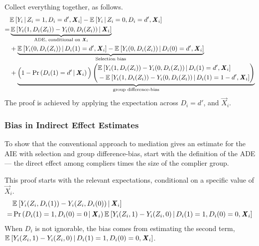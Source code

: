 Collect everything together, as follows.
\begin{align*}
    &  \mathbb{E}_{} \left[ Y_i \, \middle\vert \, Z_i = 1, D_i = d', \boldsymbol{\mathit{X}}_i \right]
    - \mathbb{E}_{} \left[ Y_i \, \middle\vert \, Z_i = 0, D_i = d', \boldsymbol{\mathit{X}}_i \right] \\
    =& \underbrace{
        \mathbb{E}_{} \left[ Y_i(1, D_i(Z_i)) - Y_i(0, D_i(Z_i)) \, \middle\vert \, \boldsymbol{\mathit{X}}_i \right]}_{
            \text{ADE, conditional on }\boldsymbol{\mathit{X}}_i} \\
    &+ \underbrace{
        \mathbb{E}_{} \left[ Y_i(0, D_i(Z_i)) \, \middle\vert \, D_i(1) = d', \boldsymbol{\mathit{X}}_i \right]
            - \mathbb{E}_{} \left[ Y_i(0, D_i(Z_i)) \, \middle\vert \, D_i(0) = d', \boldsymbol{\mathit{X}}_i \right]}_{
                \text{Selection bias}} \\
    &+ \underbrace{\Big(1 - \Pr\left( D_i(1) = d' \, \middle\vert \, \boldsymbol{\mathit{X}}_i \right)\Big)
    \left( \begin{aligned}
        &\mathbb{E}_{} \left[ Y_i(1, D_i(Z_i)) - Y_i(0, D_i(Z_i)) \, \middle\vert \, D_i(1) = d', \boldsymbol{\mathit{X}}_i \right] \\ 
        & - \mathbb{E}_{} \left[ Y_i(1, D_i(Z_i)) - Y_i(0, D_i(Z_i)) \, \middle\vert \, D_i(1) = 1 - d', \boldsymbol{\mathit{X}}_i \right]
    \end{aligned} \right)}_{
        \text{group difference-bias}}
\end{align*}
The proof is achieved by applying the expectation across $D_i = d'$, and $\vec X_i$.

\subsubsection{Bias in Indirect Effect Estimates}
To show that the conventional approach to mediation gives an estimate for the AIE with selection and group difference-bias, start with the definition of the ADE --- the direct effect among compliers times the size of the complier group.

This proof starts with the relevant expectations, conditional on a specific value of $\vec X_i$.
\begin{align*}
    &\mathbb{E}_{} \left[  Y_i(Z_i, D_i(1)) - Y_i(Z_i, D_i(0)) \, \middle\vert \, \boldsymbol{\mathit{X}}_i \right] \\
    =& \Pr\left( D_i(1) = 1, D_i(0) = 0 \, \middle\vert \, \boldsymbol{\mathit{X}}_i \right)
        \mathbb{E}_{} \left[  Y_i(Z_i, 1) - Y_i(Z_i, 0) \, \middle\vert \, D_i(1) = 1, D_i(0) = 0, \boldsymbol{\mathit{X}}_i \right]
\end{align*}
When $D_i$ is not ignorable, the bias comes from estimating the second term,\\ $\mathbb{E}_{} \left[  Y_i(Z_i, 1) - Y_i(Z_i, 0) \, \middle\vert \, D_i(1) = 1, D_i(0) = 0, \boldsymbol{\mathit{X}}_i \right]$.

